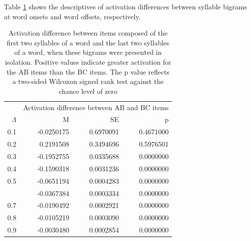 \documentclass[
]{article}
\begin{document}
Table
\ref{tab:basic-experiment-global-print-difference-between-parts-of-word2}
shows the descriptives of activation differences between syllable
bigrams at word onsets and word offsets, respectively.

\begin{table}

\caption{\label{tab:basic-experiment-global-print-difference-between-parts-of-word2}Activation difference between items composed of the first two syllables of a word and the last two syllables of a word, when these bigrams were presented in isolation. Positive values indicate greater activation for the AB items than the BC items. The p value reflects a two-sided Wilcoxon signed rank test against the chance level of zero}
\centering
\begin{tabular}[t]{rrrr}
\toprule
\multicolumn{1}{c}{ } & \multicolumn{3}{c}{Activation difference between AB and BC items} \\
\cmidrule(l{3pt}r{3pt}){2-4}
$\Lambda$ & M & SE & p\\
\midrule
0.1 & -0.0250175 & 0.6970091 & 0.4671000\\
0.2 & 0.2191508 & 0.3494696 & 0.5976501\\
0.3 & -0.1952755 & 0.0335688 & 0.0000000\\
0.4 & -0.1590318 & 0.0031236 & 0.0000000\\
0.5 & -0.0651194 & 0.0004283 & 0.0000000\\
\addlinespace
0.6 & -0.0367384 & 0.0003334 & 0.0000000\\
0.7 & -0.0190492 & 0.0002921 & 0.0000000\\
0.8 & -0.0105219 & 0.0003090 & 0.0000000\\
0.9 & -0.0030480 & 0.0002854 & 0.0000000\\
\bottomrule
\end{tabular}
\end{table}

  
\end{document}
